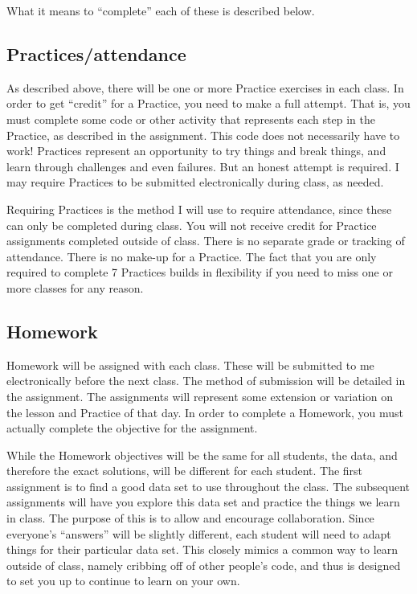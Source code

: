 \documentclass[11pt]{tufte-handout}
\begin{document}
What it means to ``complete'' each of these is described below.
\subsection*{Practices/attendance}
\label{sec-6-2}
As described above, there will be one or more Practice exercises in each class. In order to get ``credit'' for a Practice, you need to make a full attempt.  That is, you must complete some code or other activity that represents each step in the Practice, as described in the assignment.  This code does not necessarily have to work!  Practices represent an opportunity to try things and break things, and learn through challenges and even failures. But an honest attempt is required. I may require Practices to be submitted electronically during class, as needed.

Requiring Practices is the method I will use to require attendance, since these can only be completed during class.  You will not receive credit for Practice assignments completed outside of class. There is no separate grade or tracking of attendance.  There is no make-up for a Practice.  The fact that you are only required to complete 7 Practices builds in flexibility if you need to miss one or more classes for any reason. 
\subsection*{Homework}
\label{sec-6-3}
Homework will be assigned with each class.  These will be submitted to me electronically before the next class.  The method of submission will be detailed in the assignment. The assignments will represent some extension or variation on the lesson and Practice of that day.  In order to complete a Homework, you must actually complete the objective for the assignment.  

While the Homework objectives will be the same for all students, the data, and therefore the exact solutions, will be different for each student.  The first assignment is to find a good data set to use throughout the class.  The subsequent assignments will have you explore this data set and practice the things we learn in class.  The purpose of this is to allow and encourage collaboration.  Since everyone's ``answers'' will be slightly different, each student will need to adapt things for their particular data set.  This closely mimics a common way to learn outside of class, namely cribbing off of other people's code, and thus is designed to set you up to continue to learn on your own.
\end{document}
